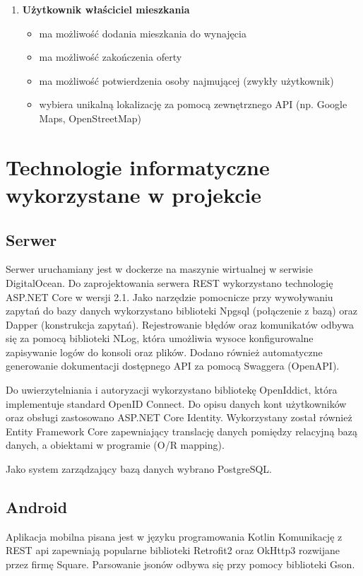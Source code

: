 \documentclass[polish, 11pt]{article}
\begin{document}
\begin{enumerate}
            \item \textbf{Użytkownik właściciel mieszkania}
            \begin{itemize}
                \item ma możliwość dodania mieszkania do wynajęcia
                \item ma możliwość zakończenia oferty
                \item ma możliwość potwierdzenia osoby najmującej (zwykły użytkownik)
                \item wybiera unikalną lokalizację za pomocą zewnętrznego API (np. Google Maps, OpenStreetMap)
            \end{itemize}
        \end{enumerate}
        
\section{Technologie informatyczne wykorzystane w projekcie}
    \subsection{Serwer}
        Serwer uruchamiany jest w dockerze na maszynie wirtualnej w serwisie DigitalOcean.
        Do zaprojektowania serwera REST wykorzystano technologię ASP.NET Core w wersji 2.1.
        Jako narzędzie pomocnicze przy wywoływaniu zapytań do bazy danych wykorzystano biblioteki Npgsql (połączenie z bazą) oraz Dapper (konstrukcja zapytań).
        Rejestrowanie błędów oraz komunikatów odbywa się za pomocą biblioteki NLog, która umożliwia wysoce konfigurowalne zapisywanie logów do konsoli oraz plików.
        Dodano również automatyczne generowanie dokumentacji dostępnego API za pomocą Swaggera (OpenAPI).
            
        Do uwierzytelniania i autoryzacji wykorzystano bibliotekę OpenIddict, która implementuje standard OpenID Connect.
        Do opisu danych kont użytkowników oraz obsługi zastosowano ASP.NET Core Identity.
        Wykorzystany został również Entity Framework Core zapewniający translację danych pomiędzy relacyjną bazą danych, a obiektami w programie (O/R mapping).
        
        Jako system zarządzający bazą danych wybrano PostgreSQL.
        
    \subsection{Android}
    	Aplikacja mobilna pisana jest w języku programowania Kotlin
    	Komunikację z REST api zapewniają popularne biblioteki Retrofit2 oraz OkHttp3 rozwijane przez firmę Square.
    	Parsowanie jsonów odbywa się przy pomocy biblioteki Gson.
    	
\end{document}
